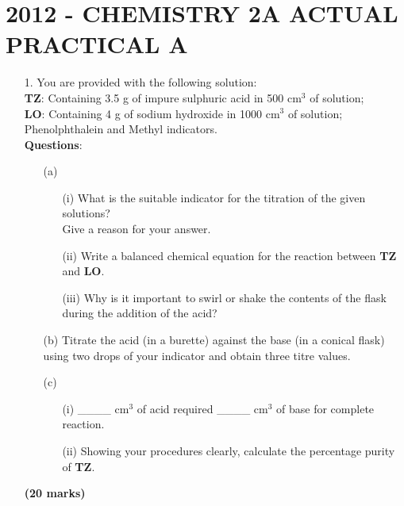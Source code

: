 \section{2012 - CHEMISTRY 2A ACTUAL PRACTICAL A}

\begin{enumerate}
\item[1.] You are provided with the following solution:\\

\textbf{TZ}: Containing 3.5 g of impure sulphuric acid in 500 cm$^3$ of solution;\\
\textbf{LO}: Containing 4 g of sodium hydroxide in 1000 cm$^3$ of solution;\\
Phenolphthalein and Methyl indicators.\\[10pt]

\textbf{Questions}:\\
\begin{enumerate}
\item[(a)] 
\begin{enumerate}
\item[(i)] What is the suitable indicator for the titration of the given solutions?\\
Give a reason for your answer.
\item[(ii)] Write a balanced chemical equation for the reaction between \textbf{TZ} and \textbf{LO}.
\item[(iii)] Why is it important to swirl or shake the contents of the flask during the addition of the acid?\\
\end{enumerate}

\item[(b)] Titrate the acid (in a burette) against the base (in a conical flask) using two drops of your indicator and obtain three titre values.\\

\item[(c)] 
\begin{enumerate}
\item[(i)] \_\_\_\_ cm$^3$ of acid required \_\_\_\_ cm$^3$ of base for complete reaction.
\item[(ii)] Showing your procedures clearly, calculate the percentage purity of \textbf{TZ}.
\end{enumerate}

\end{enumerate}
\raggedleft \textbf{(20 marks)}

\raggedright


\end{enumerate}
